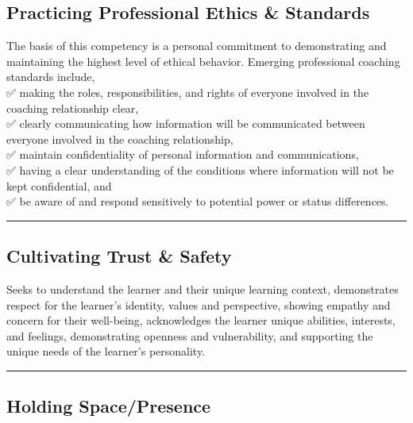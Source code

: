\documentclass[
]{book}
\begin{document}
\hypertarget{practicing-professional-ethics-standards}{%
\subsection*{\texorpdfstring{\textbf{Practicing Professional Ethics \& Standards}}{Practicing Professional Ethics \& Standards}}\label{practicing-professional-ethics-standards}}

The basis of this competency is a personal commitment to demonstrating and maintaining the highest level of ethical behavior. Emerging professional coaching standards include,\\
✅ making the roles, responsibilities, and rights of everyone involved in the coaching relationship clear,\\
✅ clearly communicating how information will be communicated between everyone involved in the coaching relationship,\\
✅ maintain confidentiality of personal information and communications,\\
✅ having a clear understanding of the conditions where information will not be kept confidential, and\\
✅ be aware of and respond sensitively to potential power or status differences.

\begin{center}\rule{0.5\linewidth}{0.5pt}\end{center}

\hypertarget{cultivating-trust-safety}{%
\subsection*{Cultivating Trust \& Safety}\label{cultivating-trust-safety}}

Seeks to understand the learner and their unique learning context, demonstrates respect for the learner's identity, values and perspective, showing empathy and concern for their well-being, acknowledges the learner unique abilities, interests, and feelings, demonstrating openness and vulnerability, and supporting the unique needs of the learner's personality.

\begin{center}\rule{0.5\linewidth}{0.5pt}\end{center}

\hypertarget{holding-spacepresence}{%
\subsection*{Holding Space/Presence}\label{holding-spacepresence}}
\end{document}
